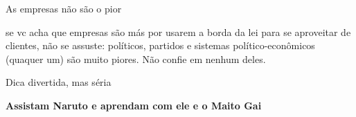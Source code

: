 \documentclass[]{beamer}
\begin{document}
\begin{frame}[standout]{As empresas não são o pior}

  se vc acha que empresas são más por usarem a borda da lei para se
  aproveitar de clientes, não se assuste: políticos, partidos e sistemas
  político-econômicos (quaquer um) são muito piores. Não confie em nenhum deles. 
\end{frame}


\begin{frame}{Dica divertida, mas séria}

  \textbf{\Huge{Assistam Naruto e aprendam com ele e o Maito
    Gai}}

\end{frame}





























\end{document}
